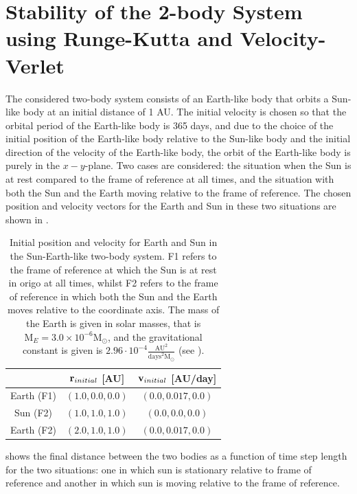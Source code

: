 \section{Stability of the 2-body System using Runge-Kutta and Velocity-Verlet}
\label{sec:stability2bodysystem}
The considered two-body system consists of an Earth-like body that orbits a Sun-like body at an initial distance of 1 AU. 
The initial velocity is chosen so that the orbital period of the Earth-like body is 365 days, and due to the choice of the initial position of the Earth-like body relative to the Sun-like body and the initial direction of the velocity of the Earth-like body, the orbit of the Earth-like body is purely in the $x-y$-plane.
Two cases are considered: the situation when the Sun is at rest compared to the frame of reference at all times, and the situation with both the Sun and the Earth moving relative to the frame of reference.
The chosen position and velocity vectors for the Earth and Sun in these two situations are shown in . 
\begin{table}[H]
\centering
\caption{
Initial position and velocity for Earth and Sun in the Sun-Earth-like two-body system. 
F1 refers to the frame of reference at which the Sun is at rest in origo at all times, whilst F2 refers to the frame of reference in which both the Sun and the Earth moves relative to the coordinate axis. 
The mass of the Earth is given in solar masses, that is $\textrm{M}_E = 3.0\times 10^{-6} \textrm{M}_{\odot}$, and the gravitational constant is given is $2.96\cdot 10^{-4} \frac{\textrm{AU}^2}{\textrm{days}^2 \textrm{M}_{\odot}}$ (see ).
}
\begin{center}
\begin{tabular}{ | c | c | c |  }
  \hline			
   &  $\mbox{\textbf{r}}_{initial}$ [AU] & $\mbox{\textbf{v}}_{initial}$ [AU/day]  
  \\ \hline
  Earth (F1) & $(1.0,0.0,0.0)$ & $(0.0,0.017,0.0)$
  \\ \hline
  Sun (F2) & $(1.0,1.0,1.0)$  & $(0.0,0.0,0.0)$ 
  \\ \hline
  Earth (F2)  & $(2.0,1.0,1.0)$ & $(0.0,0.017,0.0)$
  \\ \hline
\end{tabular}
\end{center}
\label{tab:SunEarthMarsTest}
\end{table}
 shows the final distance between the two bodies as a function of time step length for the two situations: one in which sun is stationary relative to frame of reference and another in which sun is moving relative to the frame of reference. 
